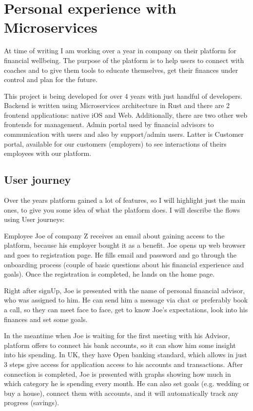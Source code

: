 \section{Personal experience with Microservices}
At time of writing I am working over a year in company on their platform for financial wellbeing. The purpose of the platform is to help users to connect with coaches and to give them tools to educate themselves, get their finances under control and plan for the future.

This project is being developed for over 4 years with just handful of developers. Backend is written using Microservices architecture in Rust and there are 2 frontend applications: native iOS and Web. Additionally, there are two other web frontends for management. Admin portal used by financial advisors to communication with users and also by support/admin users. Latter is Customer portal, available for our customers (employers) to see interactions of theirs employees with our platform.

\subsection{User journey}
Over the years platform gained a lot of features, so I will highlight just the main ones, to give you some idea of what the platform does. I will describe the flows using User journeys:

\begin{example}[Sign Up]
    Employee Joe of company Z receives an email about gaining access to the platform, because his employer bought it as a benefit. Joe opens up web browser and goes to registration page. He fills email and password and go through the onboarding process (couple of basic questions about his financial experience and goals). Once the registration is completed, he lands on the home page.
\end{example}

\begin{example}[Advisor]
    Right after signUp, Joe is presented with the name of personal financial advisor, who was assigned to him. He can send him a message via chat or preferably book a call, so they can meet face to face, get to know Joe's expectations, look into his finances and set some goals.
\end{example}

\begin{example}[Analyse]
    In the meantime when Joe is waiting for the first meeting with his Advisor, platform offers to connect his bank accounts, so it can show him some insight into his spending. In UK, they have Open banking standard, which allows in just 3 steps give access for application access to his accounts and transactions. After connection is completed, Joe is presented with graphs showing how much in which category he is spending every month. He can also set goals (e.g. wedding or buy a house), connect them with accounts, and it will automatically track any progress (savings).
\end{example}

